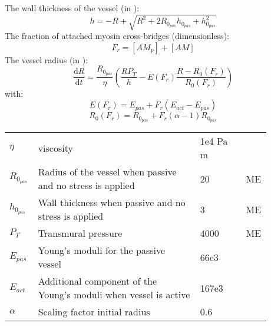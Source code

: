 The wall thickness of the vessel (in \um):
\begin{equation} \label{eq:h2}
h=-R+\sqrt{R^2+2R_{0_{pas}}h_{0_{pas}}+h_{0_{pas}}^2}
\end{equation}
%
The fraction of attached myosin cross-bridges (dimensionless):
\begin{equation}
F_r = [AM_p] + [AM]
\end{equation}
%
The vessel radius (in \um):
\begin{equation} \label{eq:dRdt2}
\dfrac{\mathrm{d}R}{\mathrm{d}t}= \frac{R_{0_{pas}}}{\eta}\left(   \frac{ R P_{T}}{h}  - E(F_r) \frac{R - R_0(F_r)}{R_0(F_r)} \right)
\end{equation}
%
with:
\begin{equation}
E(F_r)= E_{pas} + F_r \left(E_{act} - E_{pas} \right)
\end{equation}
%
\begin{equation}
R_0(F_r)=R_{0_{pas}} + F_r (\alpha -1) R_{0_{pas}}
\end{equation}
%
\begin{table}[h!]
\centering
\begin{tabular}{| p{0.09\linewidth} | >{\footnotesize} p{0.6\linewidth} | >{\footnotesize} p{0.17\linewidth} | >{\footnotesize} p{0.02\linewidth} |}
\arrayrulecolor{lightgrey}\hline
$\eta   $				& viscosity															& 1e4 Pa m 		&  \cite{Koenigsberger2006}\\
$R_{0_{pas}}$			& Radius of the vessel when passive and no stress is applied		& 20  \um 		& ME \\
$h_{0_{pas}}$			& Wall thickness when passive and no stress is applied				& 3   \um		& ME \\
$P_T$					& Transmural pressure												& 4000 \Pa		& ME \\
${E}_{pas}$				& Young's moduli for the passive vessel								& 66e3 \Pa 		&  \cite{Gore}\\
${E}_{act}$				& Additional component of the Young's moduli when vessel is active	& 167e3 \Pa 	& \cite{Gore}\\
$\alpha$				& Scaling factor initial radius										& 0.6    		& \cite{Gore}\\
\hline
\end{tabular}
\label{tab:crossbridge}
\end{table}


